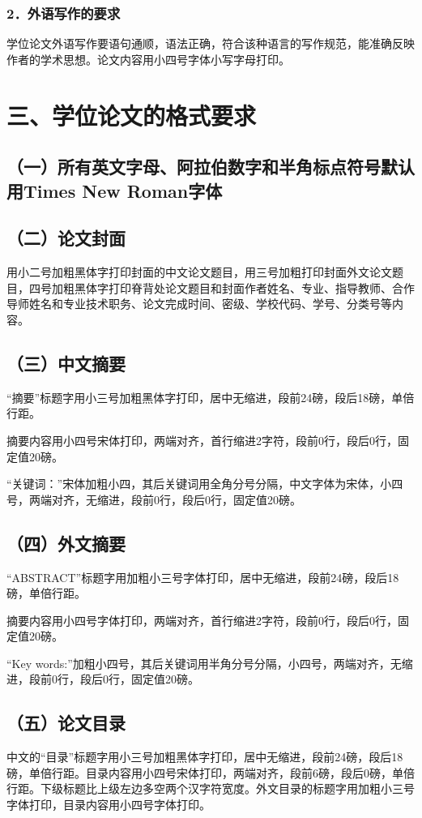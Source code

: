 \subsubsection*{2．外语写作的要求}
学位论文外语写作要语句通顺，语法正确，符合该种语言的写作规范，能准确反映作者的学术思想。论文内容用小四号字体小写字母打印。

\section{三、学位论文的格式要求}
\subsection{（一）所有英文字母、阿拉伯数字和半角标点符号默认用Times New Roman字体}
\subsection{（二）论文封面}
用小二号加粗黑体字打印封面的中文论文题目，用三号加粗打印封面外文论文题目，四号加粗黑体字打印脊背处论文题目和封面作者姓名、专业、指导教师、合作导师姓名和专业技术职务、论文完成时间、密级、学校代码、学号、分类号等内容。

\subsection{（三）中文摘要}
“摘要”标题字用小三号加粗黑体字打印，居中无缩进，段前24磅，段后18磅，单倍行距。

摘要内容用小四号宋体打印，两端对齐，首行缩进2字符，段前0行，段后0行，固定值20磅。

“关键词：”宋体加粗小四，其后关键词用全角分号分隔，中文字体为宋体，小四号，两端对齐，无缩进，段前0行，段后0行，固定值20磅。

\subsection{（四）外文摘要}
“ABSTRACT”标题字用加粗小三号字体打印，居中无缩进，段前24磅，段后18磅，单倍行距。

摘要内容用小四号字体打印，两端对齐，首行缩进2字符，段前0行，段后0行，固定值20磅。

“Key words:”加粗小四号，其后关键词用半角分号分隔，小四号，两端对齐，无缩进，段前0行，段后0行，固定值20磅。

\subsection{（五）论文目录}
中文的“目录”标题字用小三号加粗黑体字打印，居中无缩进，段前24磅，段后18磅，单倍行距。目录内容用小四号宋体打印，两端对齐，段前6磅，段后0磅，单倍行距。下级标题比上级左边多空两个汉字符宽度。外文目录的标题字用加粗小三号字体打印，目录内容用小四号字体打印。

